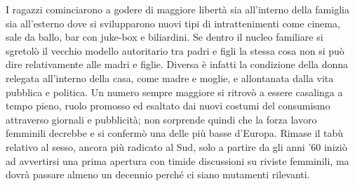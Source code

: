 I ragazzi cominciarono a godere di maggiore libertà sia all'interno della famiglia sia all'esterno dove si svilupparono nuovi tipi di intrattenimenti come cinema, sale da ballo, bar con juke-box e biliardini.
Se dentro il nucleo familiare si sgretolò il vecchio modello autoritario tra padri e figli la stessa cosa non si può dire relativamente alle madri e figlie.
Diversa è infatti la condizione della donna relegata all'interno della casa, come madre e moglie, e allontanata dalla vita pubblica e politica.
Un numero sempre maggiore si ritrovò a essere casalinga a tempo pieno, ruolo promosso ed esaltato dai nuovi costumi del consumismo attraverso giornali e pubblicità; non sorprende quindi che la forza lavoro femminili decrebbe e si confermò una delle più basse d'Europa.
Rimase il tabù relativo al sesso, ancora più radicato al Sud, solo a partire da gli anni '60 iniziò ad avvertirsi una prima apertura con timide discussioni su riviste femminili, ma dovrà passare almeno un decennio perché ci siano mutamenti rilevanti.


